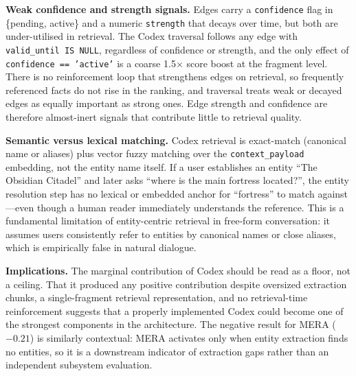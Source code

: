 \documentclass[10pt]{article}
\begin{document}
\textbf{Weak confidence and strength signals.} Edges carry a \texttt{confidence}
flag in \{pending, active\} and a numeric \texttt{strength} that decays over time,
but both are under-utilised in retrieval. The Codex traversal follows any edge
with \texttt{valid\_until IS NULL}, regardless of confidence or strength, and the
only effect of \texttt{confidence == 'active'} is a coarse 1.5$\times$ score
boost at the fragment level. There is no reinforcement loop that strengthens
edges on retrieval, so frequently referenced facts do not rise in the ranking,
and traversal treats weak or decayed edges as equally important as strong ones.
Edge strength and confidence are therefore almost-inert signals that contribute
little to retrieval quality.

\textbf{Semantic versus lexical matching.} Codex retrieval is exact-match (canonical name or aliases) plus vector fuzzy matching over the \texttt{context\_payload} embedding, not the entity name itself. If a user establishes an entity ``The Obsidian Citadel'' and later asks ``where is the main fortress located?'', the entity resolution step has no lexical or embedded anchor for ``fortress'' to match against---even though a human reader immediately understands the reference. This is a fundamental limitation of entity-centric retrieval in free-form conversation: it assumes users consistently refer to entities by canonical names or close aliases, which is empirically false in natural dialogue.

\textbf{Implications.} The marginal contribution of Codex should be read as a floor, not a ceiling. That it produced any positive contribution despite oversized extraction chunks, a single-fragment retrieval representation, and no retrieval-time reinforcement suggests that a properly implemented Codex could become one of the strongest components in the architecture. The negative result for MERA ($-0.21$) is similarly contextual: MERA activates only when entity extraction finds no entities, so it is a downstream indicator of extraction gaps rather than an independent subsystem evaluation.
\end{document}
